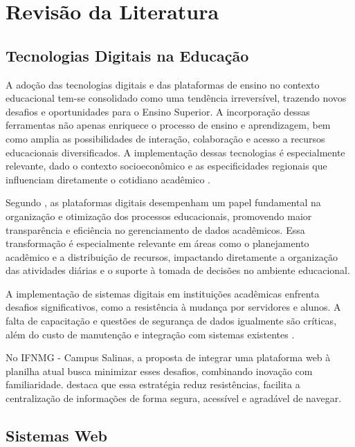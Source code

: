 \chapter{Revisão da Literatura} 
\label{cap3_revisao} 

\section{Tecnologias Digitais na Educação}

A adoção das tecnologias digitais e das plataformas de ensino no contexto educacional tem-se consolidado como uma tendência irreversível, trazendo novos desafios e oportunidades para o Ensino Superior. A incorporação dessas ferramentas não apenas enriquece o processo de ensino e aprendizagem, bem como amplia as possibilidades de interação, colaboração e acesso a recursos educacionais diversificados. A implementação dessas tecnologias é especialmente relevante, dado o contexto socioeconômico e as especificidades regionais que influenciam diretamente o cotidiano acadêmico \cite{Ferreira_Lopes_Oliveira_Carvalho_Souza_Santos_Silva_Veloso_2024}.

Segundo , as plataformas digitais desempenham um papel fundamental na organização e otimização dos processos educacionais, promovendo maior transparência e eficiência no gerenciamento de dados acadêmicos. Essa transformação é especialmente relevante em áreas como o planejamento acadêmico e a distribuição de recursos, impactando diretamente a organização das atividades diárias e o suporte à tomada de decisões no ambiente educacional.

A implementação de sistemas digitais em instituições acadêmicas enfrenta desafios significativos, como a resistência à mudança por servidores e alunos. A falta de capacitação e questões de segurança de dados igualmente são críticas, além do custo de manutenção e integração com sistemas existentes \cite{senger2022gestao}.

No IFNMG - Campus Salinas, a proposta de integrar uma plataforma web à planilha atual busca minimizar esses desafios, combinando inovação com familiaridade.  destaca que essa estratégia reduz resistências, facilita a centralização de informações de forma segura, acessível e agradável de navegar.

\section{Sistemas Web}

